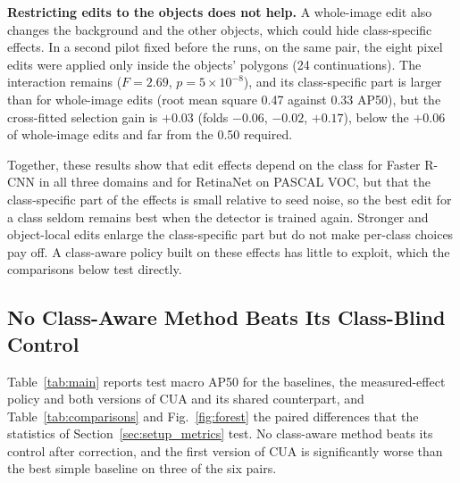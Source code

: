 \documentclass[conference]{IEEEtran}
\begin{document}
\noindent\textbf{Restricting edits to the objects does not help.} A whole-image edit also changes the background and the other objects, which could hide class-specific effects. In a second pilot fixed before the runs, on the same pair, the eight pixel edits were applied only inside the objects' polygons (24 continuations). The interaction remains ($F=2.69$, $p=5\times10^{-8}$), and its class-specific part is larger than for whole-image edits (root mean square 0.47 against 0.33 AP50), but the cross-fitted selection gain is $+0.03$ (folds $-0.06$, $-0.02$, $+0.17$), below the $+0.06$ of whole-image edits and far from the 0.50 required.

Together, these results show that edit effects depend on the class for Faster R-CNN in all three domains and for RetinaNet on PASCAL VOC, but that the class-specific part of the effects is small relative to seed noise, so the best edit for a class seldom remains best when the detector is trained again. Stronger and object-local edits enlarge the class-specific part but do not make per-class choices pay off. A class-aware policy built on these effects has little to exploit, which the comparisons below test directly.

\subsection{No Class-Aware Method Beats Its Class-Blind Control}
\label{sec:results_comparison}

Table~\ref{tab:main} reports test macro AP50 for the baselines, the measured-effect policy and both versions of CUA and its shared counterpart, and Table~\ref{tab:comparisons} and Fig.~\ref{fig:forest} the paired differences that the statistics of Section~\ref{sec:setup_metrics} test. No class-aware method beats its control after correction, and the first version of CUA is significantly worse than the best simple baseline on three of the six pairs.
\end{document}
